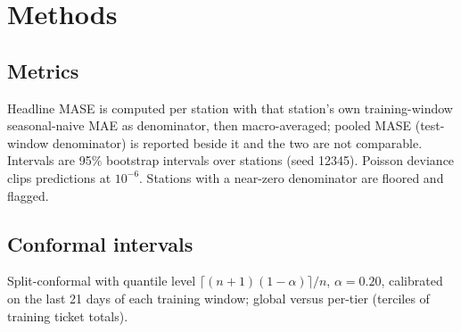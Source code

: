 \section{Methods}

\subsection{Metrics}
Headline MASE is computed per station with that station's own training-window seasonal-naive MAE as denominator, then macro-averaged; pooled MASE (test-window denominator) is reported beside it and the two are not comparable. Intervals are 95\% bootstrap intervals over stations (seed 12345). Poisson deviance clips predictions at $10^{-6}$. Stations with a near-zero denominator are floored and flagged.
\subsection{Conformal intervals}
Split-conformal with quantile level $\lceil (n+1)(1-\alpha)\rceil/n$, $\alpha=0.20$, calibrated on the last 21 days of each training window; global versus per-tier (terciles of training ticket totals).

